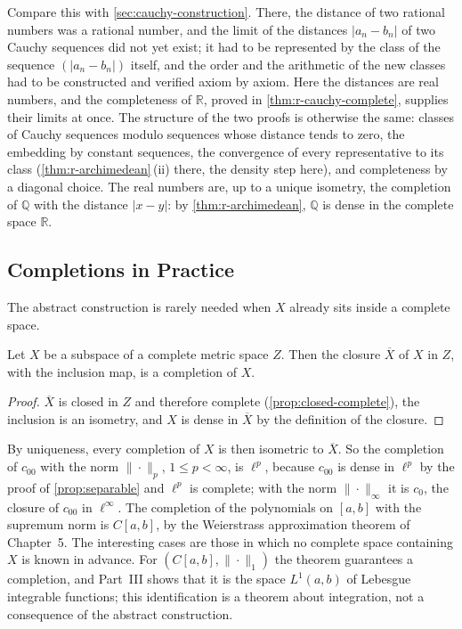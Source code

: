 Compare this with \cref{sec:cauchy-construction}. There, the distance of two rational numbers was a rational number, and the limit of the distances $|a_n-b_n|$ of two Cauchy sequences did not yet exist; it had to be represented by the class of the sequence $(|a_n-b_n|)$ itself, and the order and the arithmetic of the new classes had to be constructed and verified axiom by axiom. Here the distances are real numbers, and the completeness of $\mathbb R$, proved in \cref{thm:r-cauchy-complete}, supplies their limits at once. The structure of the two proofs is otherwise the same: classes of Cauchy sequences modulo sequences whose distance tends to zero, the embedding by constant sequences, the convergence of every representative to its class (\cref{thm:r-archimedean}\,(ii) there, the density step here), and completeness by a diagonal choice. The real numbers are, up to a unique isometry, the completion of $\mathbb Q$ with the distance $|x-y|$: by \cref{thm:r-archimedean}, $\mathbb Q$ is dense in the complete space $\mathbb R$.

\subsection{Completions in Practice}

The abstract construction is rarely needed when $X$ already sits inside a complete space.

\begin{proposition}
\label{prop:completion-closure}
Let $X$ be a subspace of a complete metric space $Z$. Then the closure $\overline X$ of $X$ in $Z$, with the inclusion map, is a completion of $X$.
\end{proposition}

\begin{proof}
$\overline X$ is closed in $Z$ and therefore complete (\cref{prop:closed-complete}), the inclusion is an isometry, and $X$ is dense in $\overline X$ by the definition of the closure.
\end{proof}

By uniqueness, every completion of $X$ is then isometric to $\overline X$. So the completion of $c_{00}$ with the norm $\|\cdot\|_p$, $1\le p<\infty$, is $\ell^p$, because $c_{00}$ is dense in $\ell^p$ by the proof of \cref{prop:separable} and $\ell^p$ is complete; with the norm $\|\cdot\|_\infty$ it is $c_0$, the closure of $c_{00}$ in $\ell^\infty$. The completion of the polynomials on $[a,b]$ with the supremum norm is $C[a,b]$, by the Weierstrass approximation theorem of Chapter~5. The interesting cases are those in which no complete space containing $X$ is known in advance. For $(C[a,b],\|\cdot\|_1)$ the theorem guarantees a completion, and Part~III shows that it is the space $L^1(a,b)$ of Lebesgue integrable functions; this identification is a theorem about integration, not a consequence of the abstract construction.


